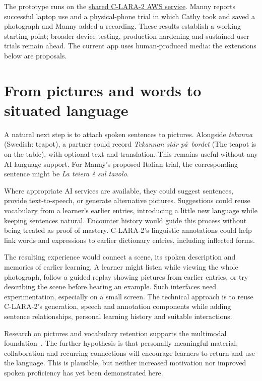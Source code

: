 \documentclass[11pt,a4paper]{article}
\begin{document}
The prototype runs on the
\href{https://c-lara-2.c-lara.org/community-dictionaries/}{shared C-LARA-2 AWS service}.
Manny reports successful laptop use and a physical-phone trial in which Cathy
took and saved a photograph and Manny added a recording. These results
establish a working starting point; broader device testing, production
hardening and sustained user trials remain ahead. The current app uses
human-produced media: the extensions below are proposals.

\section{From pictures and words to situated language}
A natural next step is to attach spoken sentences to pictures. Alongside
\emph{tekanna} (Swedish: teapot), a partner could record
\emph{Tekannan st\aa r p\aa\ bordet} (The teapot is on the table), with optional
text and translation. This remains useful without any AI language support.
For Manny's proposed Italian trial, the corresponding sentence might be
\emph{La teiera \`e sul tavolo}.

Where appropriate AI services are available, they could suggest sentences,
provide text-to-speech, or generate alternative pictures. Suggestions could
reuse vocabulary from a learner's earlier entries, introducing a little new
language while keeping sentences natural. Encounter history would guide this
process without being treated as proof of mastery. C-LARA-2's linguistic
annotations could help link words and expressions to earlier dictionary
entries, including inflected forms.

The resulting experience would connect a scene, its spoken description and
memories of earlier learning. A learner might listen while viewing the whole
photograph, follow a guided replay showing pictures from earlier entries, or
try describing the scene before hearing an example. Such interfaces need
experimentation, especially on a small screen. The technical approach is to
reuse C-LARA-2's generation, speech and annotation components while adding
sentence relationships, personal learning history and suitable interactions.

Research on pictures and vocabulary retention supports the multimodal
foundation~\cite{bisson}. The further hypothesis is that personally meaningful
material, collaboration and recurring connections will encourage learners to
return and use the language. This is plausible, but neither increased
motivation nor improved spoken proficiency has yet been demonstrated here.
\end{document}
